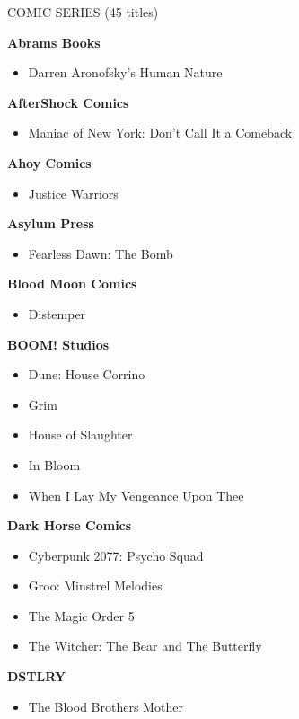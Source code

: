 \documentclass{article}
\begin{document}
\begin{center}
    COMIC SERIES (45 titles)
\end{center}

\begin{multicols}{2}
{
\raggedright


  \textbf{Abrams Books}
  \begin{itemize}
    \item Darren Aronofsky's Human Nature
  \end{itemize}

  \textbf{AfterShock Comics}
  \begin{itemize}
    \item Maniac of New York: Don't Call It a Comeback
  \end{itemize}

  \textbf{Ahoy Comics}
  \begin{itemize}
    \item Justice Warriors
  \end{itemize}

  \textbf{Asylum Press}
  \begin{itemize}
    \item Fearless Dawn: The Bomb
  \end{itemize}

  \textbf{Blood Moon Comics}
  \begin{itemize}
    \item Distemper
  \end{itemize}

  \textbf{BOOM! Studios}
  \begin{itemize}
    \item Dune: House Corrino
    \item Grim
    \item House of Slaughter
    \item In Bloom
    \item When I Lay My Vengeance Upon Thee
  \end{itemize}

  \textbf{Dark Horse Comics}
  \begin{itemize}
    \item Cyberpunk 2077: Psycho Squad
    \item Groo: Minstrel Melodies
    \item The Magic Order 5
    \item The Witcher: The Bear and The Butterfly
  \end{itemize}

  \textbf{DSTLRY}
  \begin{itemize}
    \item The Blood Brothers Mother
  \end{itemize}

}
\end{multicols}
\end{document}
